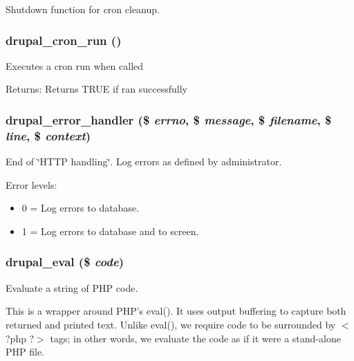 Shutdown function for cron cleanup. \hypertarget{common_8inc_1d4a4362b30215023a7120b627a9fd4f}{
\subsubsection[{drupal\_\-cron\_\-run}]{\setlength{\rightskip}{0pt plus 5cm}drupal\_\-cron\_\-run ()}}
\label{common_8inc_1d4a4362b30215023a7120b627a9fd4f}


Executes a cron run when called \begin{Desc}
\item[Returns:]Returns TRUE if ran successfully \end{Desc}
\hypertarget{common_8inc_32d79f124e1b94540b0b4edbde95a892}{
\subsubsection[{drupal\_\-error\_\-handler}]{\setlength{\rightskip}{0pt plus 5cm}drupal\_\-error\_\-handler (\$ {\em errno}, \/  \$ {\em message}, \/  \$ {\em filename}, \/  \$ {\em line}, \/  \$ {\em context})}}
\label{common_8inc_32d79f124e1b94540b0b4edbde95a892}


End of \char`\"{}HTTP handling\char`\"{}. Log errors as defined by administrator.

Error levels:\begin{itemize}
\item 0 = Log errors to database.\item 1 = Log errors to database and to screen. \end{itemize}
\hypertarget{common_8inc_97f587c4db32bc29e946f713b0c4be34}{
\subsubsection[{drupal\_\-eval}]{\setlength{\rightskip}{0pt plus 5cm}drupal\_\-eval (\$ {\em code})}}
\label{common_8inc_97f587c4db32bc29e946f713b0c4be34}


Evaluate a string of PHP code.

This is a wrapper around PHP's eval(). It uses output buffering to capture both returned and printed text. Unlike eval(), we require code to be surrounded by $<$?php ?$>$ tags; in other words, we evaluate the code as if it were a stand-alone PHP file.

